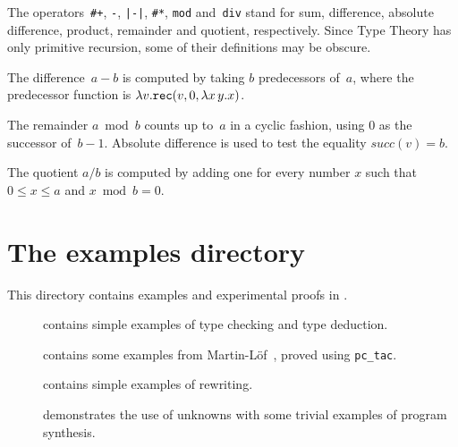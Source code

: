 The operators~\verb'#+', \verb'-', \verb'|-|', \verb'#*', \verb'mod'
and~\verb'div' stand for sum, difference, absolute difference, product,
remainder and quotient, respectively.  Since Type Theory has only primitive
recursion, some of their definitions may be obscure.  

The difference~$a-b$ is computed by taking $b$ predecessors of~$a$, where
the predecessor function is $\lambda v. {\tt rec}(v, 0, \lambda x\,y.x)$.

The remainder $a\bmod b$ counts up to~$a$ in a cyclic fashion, using 0
as the successor of~$b-1$.  Absolute difference is used to test the
equality $succ(v)=b$.

The quotient $a/b$ is computed by adding one for every number $x$
such that $0\leq x \leq a$ and $x\bmod b = 0$.



\section{The examples directory}
This directory contains examples and experimental proofs in {\CTT}.
\begin{description}
\item[]
contains simple examples of type checking and type deduction.

\item[]
contains some examples from Martin-L\"of~\cite{martinlof84}, proved using 
{\tt pc_tac}.

\item[]
contains simple examples of rewriting.

\item[]
demonstrates the use of unknowns with some trivial examples of program
synthesis. 
\end{description}


